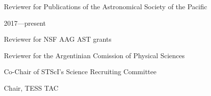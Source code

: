 \documentclass[12pt, a4paper]{article} %
\begin{document}
\vspace{0.2cm}

\begin{minipage}[t]{0.7\textwidth}
\begin{flushleft}%
  \setlength{\leftskip}{0.2cm}%
Reviewer for Publications of the Astronomical Society of the Pacific 
\end{flushleft}
\end{minipage}
\begin{minipage}[t]{0.3\textwidth}
\hfill 2017---present
\end{minipage}

\vspace{0.2cm}

\begin{minipage}[t]{0.7\textwidth}
\begin{flushleft}%
  \setlength{\leftskip}{0.2cm}%
Reviewer for NSF AAG AST grants
\end{flushleft}
\end{minipage}
\begin{minipage}[t]{0.3\textwidth}
\end{minipage}

\vspace{0.2cm}

\begin{minipage}[t]{0.7\textwidth}
\begin{flushleft}%
  \setlength{\leftskip}{0.2cm}%
Reviewer for the Argentinian Comission of Physical Sciences
\end{flushleft}
\end{minipage}
\begin{minipage}[t]{0.3\textwidth}
\end{minipage}

\vspace{0.2cm}

\begin{minipage}[t]{0.7\textwidth}
\begin{flushleft}%
  \setlength{\leftskip}{0.2cm}%
Co-Chair of STScI's Science Recruiting Committee
\end{flushleft}
\end{minipage}
\begin{minipage}[t]{0.3\textwidth}
\hfill 
\end{minipage}

\vspace{0.2cm}

\begin{minipage}[t]{0.7\textwidth}
\begin{flushleft}%
  \setlength{\leftskip}{0.2cm}%
Chair, TESS TAC
\end{flushleft}
\end{minipage}
\begin{minipage}[t]{0.3\textwidth}
\hfill 
\end{minipage}
\end{document}
